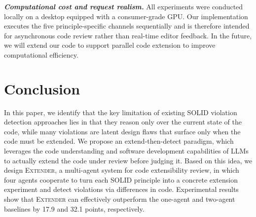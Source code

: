 \documentclass[sigconf,screen]{acmart}
\newcommand{\tool}{\textsc{Extender}\xspace}
\begin{document}
\noindent
\textbf{\textit{Computational cost and request realism.}}
All experiments were conducted locally on a desktop equipped with a consumer-grade GPU. 
Our implementation executes the five principle-specific channels sequentially and is therefore intended for asynchronous code review rather than real-time editor feedback. 
In the future, we will extend our code to support parallel code extension to improve computational efficiency.

\section{Conclusion}
In this paper, we identify that the key limitation of existing SOLID violation detection approaches lies in that they reason only over the current state of the code, while many violations are latent design flaws that surface only when the code must be extended.
We propose an extend-then-detect paradigm, which leverages the code understanding and software development capabilities of LLMs to actually extend the code under review before judging it.
Based on this idea, we design \tool, a multi-agent system for code extensibility review, in which four agents cooperate to turn each SOLID principle into a concrete extension experiment and detect violations via differences in code.
Experimental results show that \tool can effectively outperform the one-agent and two-agent baselines by 17.9 and 32.1 points, respectively.

\clearpage


\end{document}
